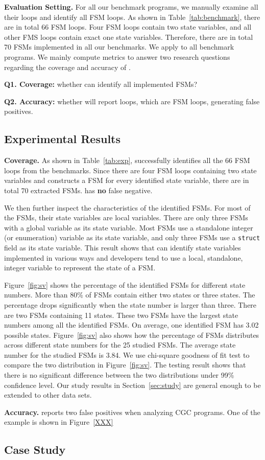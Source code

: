 \noindent\textbf{Evaluation Setting.} 
For all our benchmark programs, we manually examine all their loops and 
identify all FSM loops. 
As shown in Table~\ref{tab:benchmark}, there are in 
total 66 FSM loops.
Four FSM loops contain two state variables, 
and all other FMS loops contain exact one state variables.
Therefore, there are in total 70 FSMs implemented in all our benchmarks.  
We apply \Tool{} to all benchmark programs. 
We mainly compute metrics to answer two research 
questions regarding the coverage and accuracy of \Tool{}.

\textbf{Q1. Coverage:} whether \Tool{} can identify all implemented FSMs?
 
\textbf{Q2. Accuracy:} whether \Tool{} will report loops, which are FSM loops, 
generating false positives. 

\subsection{Experimental Results}
\label{sec:results}



\noindent\textbf{Coverage.}
As shown in Table~\ref{tab:exp}, \Tool{} successfully identifies 
all the 66 FSM loops 
from the benchmarks. Since there are four FSM loops containing 
two state variables and \Tool{} constructs a FSM for every identified state variable, 
there are in total 70 extracted FSMs. 
\Tool{} has \textbf{no} false negative.

We then further inspect the characteristics of the identified FSMs.
For most of the FSMs, their state variables are local variables.
There are only three FSMs with a global variable as its state variable. 
Most FSMs use a standalone integer (or enumeration) variable as its state variable,
and only three FSMs use a \texttt{struct} field as its state variable.  
This result shows that \Tool{} can identify state variables implemented in various ways
and developers tend to use a local, standalone, integer variable to 
represent the state of a FSM.




Figure~\ref{fig:sv} shows the percentage of the identified FSMs
for different state numbers. 
More than 80\% of FSMs contain either two states or three states. 
The percentage drops significantly when the state number is larger than three. 
There are two FSMs containing 11 states. 
These two FSMs have the largest state numbers among all the identified FSMs. 
On average, one identified FSM has 3.02 possible states. 
Figure~\ref{fig:sv} also shows how the percentage of FSMs distributes 
across different state numbers 
for the 25 studied FSMs. 
The average state number for the studied FSMs is 3.84.
We use chi-square goodness of fit test to compare 
the two distribution in Figure~\ref{fig:sv}. 
The testing result shows that there is no significant 
difference between the two distributions 
under 99\% confidence level. 
Our study results in Section~\ref{sec:study} are general enough to be 
extended to other data sets. 




\noindent\textbf{Accuracy.}
\Tool{} reports two false positives when analyzing CGC programs. 
One of the example is shown in Figure~\ref{XXX}


\subsection{Case Study}